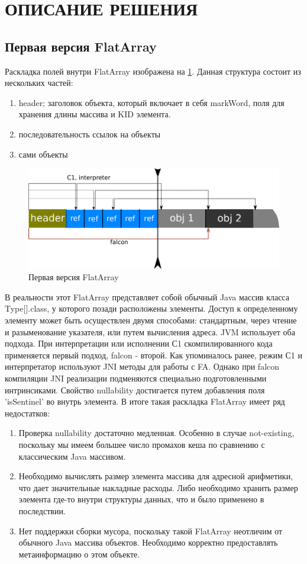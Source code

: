 \section*{ОПИСАНИЕ РЕШЕНИЯ} 
\addtocounter{section}{1}
\setcounter{subsection}{0}

\subsection{Первая версия FlatArray} 
Раскладка полей внутри FlatArray изображена на \ref{first-fa}.
Данная структура состоит из нескольких частей:
\begin{enumerate}
	\item header; заголовок объекта, который включает в себя markWord, поля для хранения длины массива и KID элемента.
	\item последовательность ссылок на объекты
	\item сами объекты
\end{enumerate}
\begin{figure}[h]
	\includegraphics[width=0.95\linewidth]{image/flatarray.png}
	\caption{Первая версия FlatArray}\label{first-fa}
\end{figure}
В реальности этот FlatArray представляет собой обычный Java массив класса Type[].class, у которого позади расположены элементы. Доступ к определенному элементу может быть осуществлен двумя способами: стандартным, через чтение и разыменование указателя, или путем вычисления адреса. 
JVM использует оба подхода. При интерпретации или исполнении С1 скомпилированного кода применяется первый подход, falcon - второй. 
Как упоминалось ранее, режим С1 и интерпретатор используют JNI методы для работы с FA. Однако при falcon компиляции JNI реализации подменяются специально подготовленными интринсиками. 
Свойство nullability достигается путем добавления поля 'isSentinel' во внутрь элемента. 
В итоге такая раскладка FlatArray имеет ряд недостатков:
\begin{enumerate}
	\item Проверка nullability достаточно медленная. Особенно в случае not-existing, поскольку мы имеем большее число промахов кеша по сравнению с классическим Java массивом.
	\item Необходимо вычислять размер элемента массива для адресной арифметики, что дает значительные накладные расходы. Либо необходимо хранить размер элемента где-то внутри структуры данных, что и было применено в последствии.
	\item Нет поддержки сборки мусора, поскольку такой FlatArray неотличим от обычного Java массива объектов. 
	Необходимо корректно предоставлять метаинформацию о этом объекте. 
\end{enumerate}

